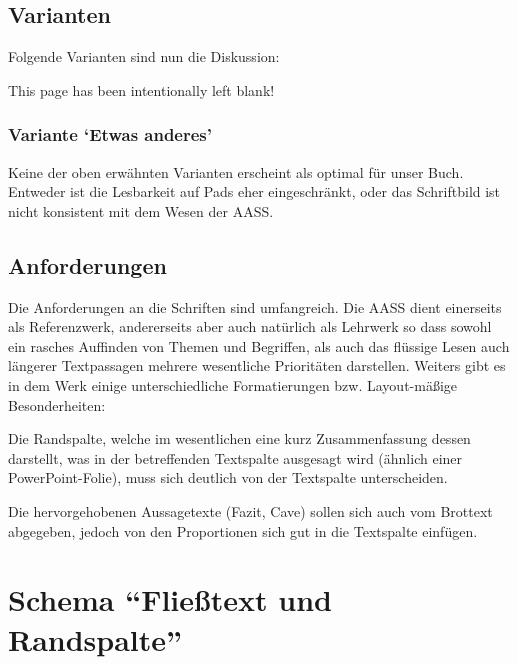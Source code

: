 \documentclass[
ngerman,
paper=a4,
asymmetric,
fontsize=10pt,
draft=false,
numbers=noenddot,
bibtotocnumbered,
footnotes=multiple,
toc=flat,
]{scrbook}
\begin{document}
\subsection{Varianten}
Folgende Varianten sind nun
die Diskussion:

\clearpage

This page has been intentionally left blank!

\clearpage

\clearpage
\subsubsection{Variante \enquote*{Etwas anderes}}

Keine der oben erwähnten Varianten erscheint als optimal für
unser Buch. Entweder ist die Lesbarkeit auf Pads eher
eingeschränkt, oder das Schriftbild ist nicht konsistent mit
dem Wesen der AASS.


\subsection{Anforderungen}

Die Anforderungen an die Schriften sind umfangreich. Die
AASS dient einerseits als Referenzwerk, andererseits aber
auch natürlich als Lehrwerk so dass sowohl ein rasches
Auffinden von Themen und Begriffen, als auch das flüssige
Lesen auch längerer Textpassagen mehrere wesentliche
Prioritäten darstellen. Weiters gibt es in dem Werk einige
unterschiedliche Formatierungen bzw. Layout-mäßige
Besonderheiten:

Die Randspalte, welche im wesentlichen eine kurz
Zusammenfassung dessen darstellt, was in der betreffenden
Textspalte ausgesagt wird (ähnlich einer PowerPoint-Folie),
muss sich deutlich von der Textspalte unterscheiden.

Die hervorgehobenen Aussagetexte (Fazit, Cave) sollen sich
auch vom Brottext abgegeben, jedoch von den Proportionen
sich gut in die Textspalte einfügen.


















\section{Schema \enquote{Fließtext und Randspalte}}
\end{document}
